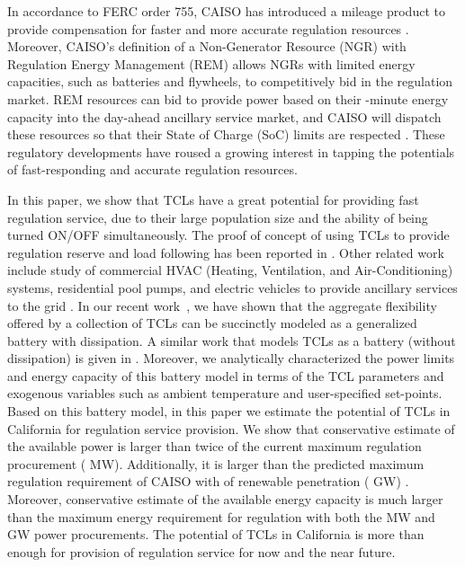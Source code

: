 \documentclass[onecolumn,journal]{IEEEtran}
\begin{document}
In accordance to FERC order 755, CAISO has introduced a mileage product to provide compensation for faster and more accurate regulation resources \cite{CAISO_755}. Moreover, CAISO's definition of a Non-Generator Resource (NGR) with Regulation Energy Management (REM) allows NGRs with limited energy capacities, such as batteries and flywheels, to competitively bid in the regulation market. REM resources can bid to provide power based on their -minute energy capacity into the day-ahead ancillary service market, and \ac{CAISO} will dispatch these resources so that their State of Charge (SoC) limits are respected \cite{CAISO_storage}. These regulatory developments have roused a growing interest in tapping the potentials of  fast-responding and accurate regulation resources. 



In this paper, we show that \acp{TCL} have a great potential for providing fast regulation service, due to their large population size and the ability of being turned ON/OFF simultaneously. The proof of concept of using \acp{TCL} to provide regulation reserve and load following has been reported in \cite{lu2012evaluation, mathieu2013state, Hiskens, zhang2013aggregated, bashash2013modeling}. Other related work include study of commercial HVAC (Heating, Ventilation, and Air-Conditioning) systems, residential pool pumps, and electric vehicles to provide ancillary services to the grid \cite{lin2013low, HH_YL_AK_PB_SM_TSG:14, oldewurtel2013towards, meyn2014ancillary,haocharacterizing,barooahspectral, kempton2008test,AN_JT_AS_KP_PV_CDC:13}.  In our recent work~\cite{hehao2013generalized,HH_BS_KP_TV_TPS_2013}, we have shown that the aggregate flexibility offered by a collection of \acp{TCL} can be succinctly modeled as a generalized battery with dissipation. A similar work that models TCLs as a battery (without dissipation) is given in \cite{mathieu2013energy}. Moreover, we analytically characterized the power limits and energy capacity of this battery model in terms of the \ac{TCL} parameters and exogenous variables such as ambient temperature and user-specified set-points. Based on this battery model, in this paper we estimate the potential of \acp{TCL} in California for regulation service provision. We show that conservative estimate of the available power is larger than twice of the current maximum regulation procurement ( MW). Additionally,  it is larger than the predicted maximum regulation requirement of \ac{CAISO} with  of renewable penetration ( GW)  \cite{helman2010resource}. Moreover, conservative estimate of the available energy capacity is much larger than the maximum energy requirement for regulation with both the  MW and  GW power procurements. The potential of \acp{TCL} in California is more than enough for provision of regulation service for now and the near future.
\end{document}
